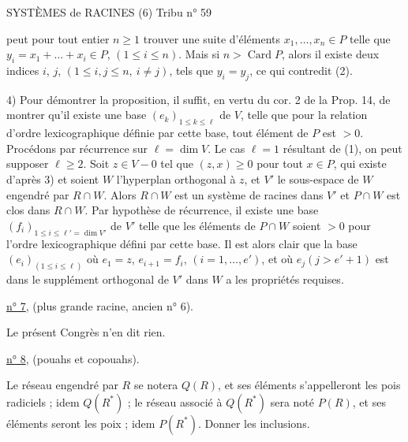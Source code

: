SYSTÈMES de RACINES (6) \hfill Tribu n° 59

peut pour tout entier $n\geq1$ trouver une suite d'éléments $x_1,\ldots,x_n\in P$ telle que $y_i=x_1+\ldots+x_i\in P$, $(1\leq i\leq n)$. Mais si $n>\operatorname{Card}P$, alors il existe deux indices $i$, $j$, $(1\leq i,j\leq n,\ i\ne j)$, tels que $y_i=y_j$, ce qui contredit (2).

4) Pour démontrer la proposition, il suffit, en vertu du cor. 2 de la Prop. 14, de montrer qu'il existe une base $(e_k)_{1\leq k\leq\ell}$ de $V$, telle que pour la relation d'ordre lexicographique définie par cette base, tout élément de $P$ est $>0$. Procédons par récurrence sur $\ell=\dim V$. Le cas $\ell=1$ résultant de (1), on peut supposer $\ell\geq2$. Soit $z\in V-0$ tel que $(z,x)\geq0$ pour tout $x\in P$, qui existe d'après 3) et soient $W$ l'hyperplan orthogonal à $z$, et $V'$ le sous-espace de $W$ engendré par $R\cap W$. Alors $R\cap W$ est un système de racines dans $V'$ et $P\cap W$ est clos dans $R\cap W$. Par hypothèse de récurrence, il existe une base $(f_i)_{1\leq i\leq\ell'=\dim V'}$ de $V'$ telle que les éléments de $P\cap W$ soient $>0$ pour l'ordre lexicographique défini par cette base. Il est alors clair que la base $(e_i)_{(1\leq i\leq\ell)}$ où $e_1=z$, $e_{i+1}=f_i$, $(i=1,\ldots,e')$, et où $e_j(j>e'+1)$ est dans le supplément orthogonal de $V'$ dans $W$ a les propriétés requises.

\uline{n° 7}, (plus grande racine, ancien n° 6).

Le présent Congrès n'en dit rien.

\uline{n° 8}, (pouahs et copouahs).

Le réseau engendré par $R$ se notera $Q(R)$, et ses éléments s'appelleront les pois radiciels ; idem $Q(R^*)$ ; le réseau associé à $Q(R^*)$ sera noté $P(R)$, et ses éléments seront les poix ; idem $P(R^*)$. Donner les inclusions.

